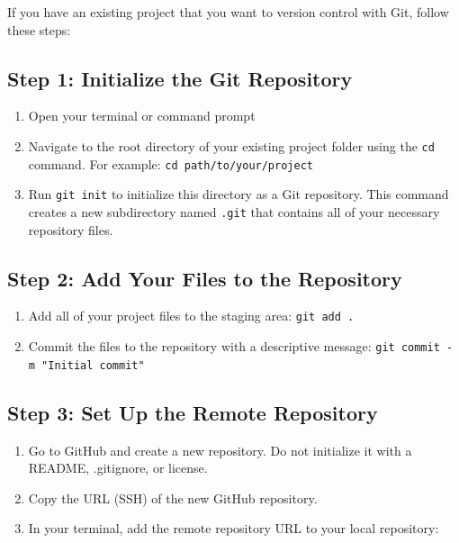 \documentclass[
  11pt,
  letterpaper,
  DIV=11,
  numbers=noendperiod]{scrartcl}
\providecommand{\tightlist}{%
  \setlength{\itemsep}{0pt}\setlength{\parskip}{0pt}}\usepackage{longtable,booktabs,array}
\let\textttOrig\texttt
\renewcommand{\texttt}[1]{\textttOrig{\colorbox{codebggray}{\textcolor{codefontcolor}{#1}}}}
\begin{document}
If you have an existing project that you want to version control with
Git, follow these steps:

\subsection{Step 1: Initialize the Git
Repository}\label{step-1-initialize-the-git-repository}

\begin{enumerate}
\def\labelenumi{\arabic{enumi}.}
\tightlist
\item
  Open your terminal or command prompt
\item
  Navigate to the root directory of your existing project folder using
  the \texttt{cd} command. For example:
  \texttt{cd\ path/to/your/project}
\item
  Run \texttt{git\ init} to initialize this directory as a Git
  repository. This command creates a new subdirectory named
  \texttt{.git} that contains all of your necessary repository files.
\end{enumerate}

\subsection{Step 2: Add Your Files to the
Repository}\label{step-2-add-your-files-to-the-repository}

\begin{enumerate}
\def\labelenumi{\arabic{enumi}.}
\tightlist
\item
  Add all of your project files to the staging area:
  \texttt{git\ add\ .}
\item
  Commit the files to the repository with a descriptive message:
  \texttt{git\ commit\ -m\ "Initial\ commit"}
\end{enumerate}

\subsection{Step 3: Set Up the Remote
Repository}\label{step-3-set-up-the-remote-repository}

\begin{enumerate}
\def\labelenumi{\arabic{enumi}.}
\tightlist
\item
  Go to GitHub and create a new repository. Do not initialize it with a
  README, .gitignore, or license.
\item
  Copy the URL (SSH) of the new GitHub repository.
\item
  In your terminal, add the remote repository URL to your local
  repository:
\end{enumerate}
\end{document}
